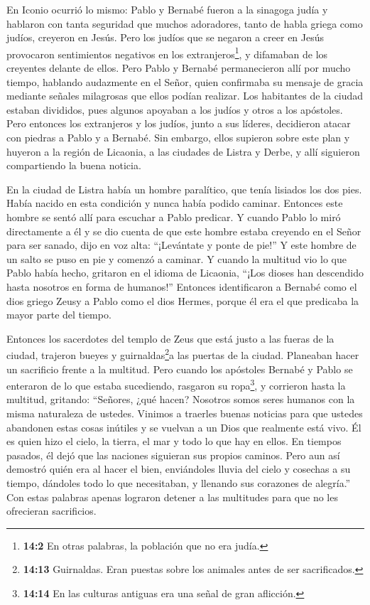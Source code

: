  En Iconio ocurrió lo mismo: Pablo y Bernabé fueron a la
sinagoga judía y hablaron con tanta seguridad que muchos adoradores,
tanto de habla griega como judíos, creyeron en Jesús.  Pero
los judíos que se negaron a creer en Jesús provocaron sentimientos
negativos en los extranjeros\footnote{\textbf{14:2} En otras palabras,
  la población que no era judía.}, y difamaban de los creyentes delante
de ellos.  Pero Pablo y Bernabé permanecieron allí por mucho
tiempo, hablando audazmente en el Señor, quien confirmaba su mensaje de
gracia mediante señales milagrosas que ellos podían realizar.
 Los habitantes de la ciudad estaban divididos, pues algunos
apoyaban a los judíos y otros a los apóstoles.  Pero
entonces los extranjeros y los judíos, junto a sus líderes, decidieron
atacar con piedras a Pablo y a Bernabé.  Sin embargo, ellos
supieron sobre este plan y huyeron a la región de Licaonia, a las
ciudades de Listra y Derbe,  y allí siguieron compartiendo
la buena noticia.

 En la ciudad de Listra había un hombre paralítico, que
tenía lisiados los dos pies. Había nacido en esta condición y nunca
había podido caminar.  Entonces este hombre se sentó allí
para escuchar a Pablo predicar. Y cuando Pablo lo miró directamente a él
y se dio cuenta de que este hombre estaba creyendo en el Señor para ser
sanado,  dijo en voz alta: ``¡Levántate y ponte de pie!'' Y
este hombre de un salto se puso en pie y comenzó a caminar.
 Y cuando la multitud vio lo que Pablo había hecho,
gritaron en el idioma de Licaonia, ``¡Los dioses han descendido hasta
nosotros en forma de humanos!''  Entonces identificaron a
Bernabé como el dios griego Zeusy a Pablo como el dios Hermes, porque él
era el que predicaba la mayor parte del tiempo.

 Entonces los sacerdotes del templo de Zeus que está justo
a las fueras de la ciudad, trajeron bueyes y guirnaldas\footnote{\textbf{14:13}
  Guirnaldas. Eran puestas sobre los animales antes de ser sacrificados.}a
las puertas de la ciudad. Planeaban hacer un sacrificio frente a la
multitud.  Pero cuando los apóstoles Bernabé y Pablo se
enteraron de lo que estaba sucediendo, rasgaron su ropa\footnote{\textbf{14:14}
  En las culturas antiguas era una señal de gran aflicción.}, y
corrieron hasta la multitud, gritando:  ``Señores, ¿qué
hacen? Nosotros somos seres humanos con la misma naturaleza de ustedes.
Vinimos a traerles buenas noticias para que ustedes abandonen estas
cosas inútiles y se vuelvan a un Dios que realmente está vivo. Él es
quien hizo el cielo, la tierra, el mar y todo lo que hay en ellos.
 En tiempos pasados, él dejó que las naciones siguieran sus
propios caminos.  Pero aun así demostró quién era al hacer
el bien, enviándoles lluvia del cielo y cosechas a su tiempo, dándoles
todo lo que necesitaban, y llenando sus corazones de alegría.''
 Con estas palabras apenas lograron detener a las
multitudes para que no les ofrecieran sacrificios.

